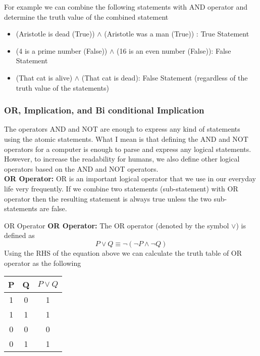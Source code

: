 For example we can combine the following statements with AND operator and determine the truth value of the combined statement

\begin{itemize}
	\item (Aristotle is dead (True)) $\wedge$ (Aristotle was a man (True)) : True Statement
	\item (4 is a prime number (False)) $\wedge$ (16 is an even number (False)): False Statement
	\item (That cat is alive) $\wedge$ (That cat is dead): False Statement (regardless of the truth value of the statements)
\end{itemize}

\subsubsection{OR, Implication, and Bi conditional Implication}
The operators AND and NOT are enough to express any kind of statements using the atomic statements. What I mean is that defining the AND and NOT operators for a computer is enough to parse and express any logical statements. However, to increase the readability for humans, we also define other logical operators based on the AND and NOT operators. \\

\textbf{OR Operator:} OR is an important logical operator that we use in our everyday life very frequently. If we combine two statements (sub-statement) with OR operator then the resulting statement is always true unless the two sub-statements are false. 

\begin{defbox}{OR Operator}
	\textbf{OR Operator:} The OR operator (denoted by the symbol $\vee$) is defined as
	\[ P \vee Q \equiv \neg (\neg P \wedge \neg Q) \]
	Using the RHS of the equation above we can calculate the truth table of OR operator as the following
	\begin{center}
		\begin{tabular}{|c|c|c|}
			\hline
			P & Q & $ P \vee Q $ \\
			\hline
			1 & 0 & 1 \\
			\hline
			1 & 1 & 1 \\
			\hline
			0 & 0 & 0 \\
			\hline
			0 & 1 & 1 \\
			\hline
		\end{tabular}
	\end{center}
\end{defbox}

